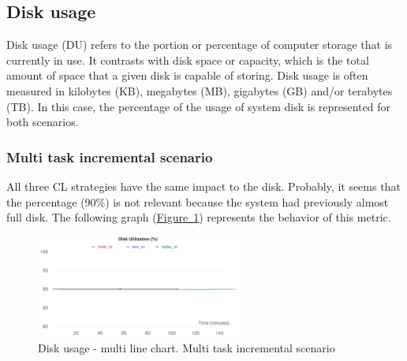 \documentclass[english, LaM, oneside]{sapthesis}%
\begin{document}
\subsection{Disk usage}
Disk usage (DU) refers to the portion or percentage of computer storage that is currently in use. It contrasts with disk space or capacity, which is the total amount of space that a given disk is capable of storing. Disk usage is often measured in kilobytes (KB), megabytes (MB), gigabytes (GB) and/or terabytes (TB).
In this case, the percentage of the usage of system disk is represented for both scenarios.

\subsubsection{Multi task incremental scenario}
All three CL strategies have the same impact to the disk. Probably, it seems that the percentage (90\%) is not relevant because the system had previously almost full disk. The following graph (\hyperref[Fig:106]{Figure~\ref*{Fig:106}}) represents the behavior of this metric.
\begin{figure}[!h]
  
     \centering
     \includegraphics[width=0.60\textwidth]{overview disk utilization nc.png}
     \caption{Disk usage - multi line chart. Multi task incremental scenario}\label{Fig:106}
   
   
\end{figure}


 
\vspace{10mm}
\end{document}
